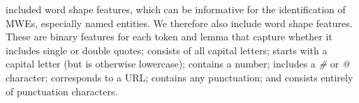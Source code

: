 \documentclass[11pt,a4paper]{article}
\begin{document}





 included word shape features,
which can be informative for the identification of MWEs, especially
named entities. We therefore also include word shape features. These
are binary features for each token and lemma that capture whether it
includes single or double quotes; consists of all capital letters;
starts with a capital letter (but is otherwise lowercase); contains a
number; includes a \emph{\#} or \emph{@} character; corresponds to a
URL; contains any punctuation; and consists entirely of punctuation
characters.










\end{document}
